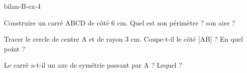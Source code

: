 \begin{blocEdition}{bilan-B-ex-4}
\begin{questions}
\item Construire un carré ABCD de côté 6 cm. Quel est son périmètre ? son aire ?
\item Tracer le cercle de centre A et de rayon 3 cm. Coupe-t-il le côté [AB] ? En quel point ?
\item Le carré a-t-il un axe de symétrie passant par A ? Lequel ?
\end{questions}\par{}\par\par{}\par{}\par{}\par{}\par{}\par{}
\end{blocEdition}
